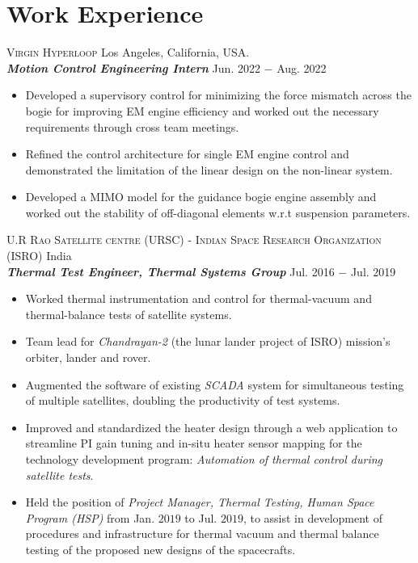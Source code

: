 \documentclass[letterpaper,10pt]{article}
\begin{document}
\section{Work Experience}
\noindent \textsc{Virgin Hyperloop} \hfill Los Angeles, California, USA.\\
\vspace{3pt}
\textbf{\textit{Motion Control Engineering Intern}} \hfill Jun. 2022 $-$ Aug. 2022
\begin{itemize}[noitemsep,nolistsep,leftmargin=0.25in,label={--}]
    \item Developed a supervisory control for minimizing the force mismatch
across the bogie for improving EM engine efficiency and worked out the necessary
requirements through cross team meetings.
\item Refined the control architecture for single EM engine control and
demonstrated the limitation of the linear design on the non-linear system.
\item Developed a MIMO model for the guidance bogie engine assembly and worked
out the stability of off-diagonal elements w.r.t suspension parameters.
\end{itemize}
\vspace{10pt}
\noindent \textsc{U.R Rao Satellite centre (URSC) - Indian Space Research Organization (ISRO)} \hfill India \\
\vspace{3pt}
\textbf{\textit{Thermal Test Engineer, Thermal Systems Group}} \hfill Jul. 2016 $-$ Jul. 2019
\begin{itemize}[noitemsep,nolistsep,leftmargin=0.25in,label={--}]
    \item Worked thermal instrumentation and control for thermal-vacuum and thermal-balance tests of satellite systems.
	\item Team lead for \textit{Chandrayan-2} (the lunar lander project of ISRO) mission's orbiter, lander and rover.
    \item Augmented the software of existing \textit{SCADA} system for simultaneous testing of multiple satellites, doubling the productivity of test systems.
	\item Improved and standardized the heater design through a web application to streamline PI gain tuning and in-situ heater sensor mapping for the technology development program: \textit{Automation of thermal control during satellite tests}.
    \item Held the position of \textit{Project Manager, Thermal Testing, Human Space Program (HSP)} from Jan. $2019$ to Jul. $2019$, to assist in development of procedures and infrastructure for thermal vacuum and thermal balance testing of the proposed new designs of the spacecrafts.\\
\end{itemize}
\end{document}
